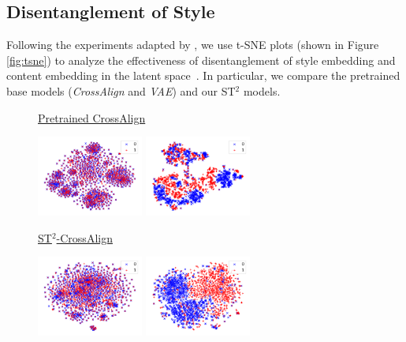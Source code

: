 \subsection{Disentanglement of Style}
\label{sec:disentangle}

Following the experiments adapted by \citet{john2018disentangled}, we use t-SNE plots (shown in Figure \ref{fig:tsne}) to analyze the effectiveness of disentanglement of style embedding and content embedding in the latent space~\cite{maaten2008visualizing}. In particular, we compare the pretrained base models (\emph{CrossAlign} and \emph{VAE}) and our ST$^2$ models. 

\begin{figure}[th]
	\underline{\small Pretrained CrossAlign}\\
	\begin{minipage}{0.45\linewidth}
		\centering
		\includegraphics[width=3.5cm]{./images/ca_pre_c.pdf}
	\end{minipage}
	\begin{minipage}{0.45\linewidth}
		\centering
		\includegraphics[width=3.5cm]{./images/ca_pre_s.pdf}
	\end{minipage}
	\underline{\small ST$^2$-CrossAlign}\\
	\begin{minipage}{0.45\linewidth}
		\centering
		\includegraphics[width=3.5cm]{./images/ca_maml_c.pdf}
	\end{minipage}
	\begin{minipage}{0.45\linewidth}
		\centering
		\includegraphics[width=3.5cm]{./images/ca_maml_s.pdf}

\end{minipage}
\end{figure}
